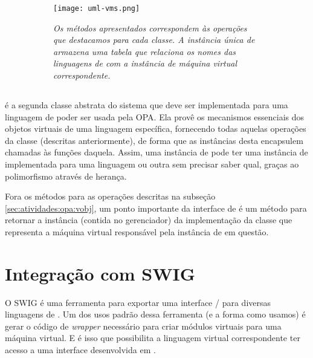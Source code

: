   \begin{figure}[ht]
    \centering
    \caption{}
    \begin{subfigure}{.8\textwidth}
      \begin{center}
        \texttt{[image: uml-vms.png]}
        \vspace{1em}

        \textit{
          Os métodos apresentados correspondem às operações que destacamos para
          cada classe. A instância única de \SMgr{} armazena uma tabela que
          relaciona os nomes das linguagens de \script{} com a instância de
          máquina virtual correspondente.
        }
      \end{center}
    \end{subfigure}
    \label{fig:uml-vms}
  \end{figure}
  
  \subsection{\VData{}}
  \label{sec:atividades:opa:vdata}
  \VData{} é a segunda classe abstrata do sistema que deve ser implementada para uma linguagem
  de \script{} poder ser usada pela OPA. Ela provê os mecanismos essenciais dos objetos virtuais
  de uma linguagem específica, fornecendo todas aquelas
  operações da classe \VObj{} (descritas anteriormente), de forma que as instâncias desta
  encapsulem chamadas às funções daquela. Assim, uma instância
  de \VObj{} pode ter uma instância de \VData{} implementada para uma linguagem 
  ou outra sem precisar saber qual, graças ao polimorfismo através de herança.

  
  Fora os métodos para as operações descritas na subseção \ref{sec:atividades:opa:vobj}, um ponto
  importante da interface de \VData{} é um método para retornar a instância (contida no gerenciador) 
  da implementação da classe \VMac{} que representa a máquina virtual responsável pela instância de
  \VData{} em questão.
  
  \section{Integração com SWIG}
  \label{sec:actividads:integracaoswig}
  O SWIG é uma ferramenta para exportar uma interface \C{}/\CXX{} para diversas 
  linguagens de \script{}. Um dos usos padrão dessa ferramenta (e 
  a forma como usamos) é gerar o código de \textit{wrapper} necessário para criar 
  módulos virtuais para uma máquina virtual.
  E é isso que possibilita a linguagem virtual correspondente ter acesso a uma
  interface desenvolvida em \CXX{}.
  
